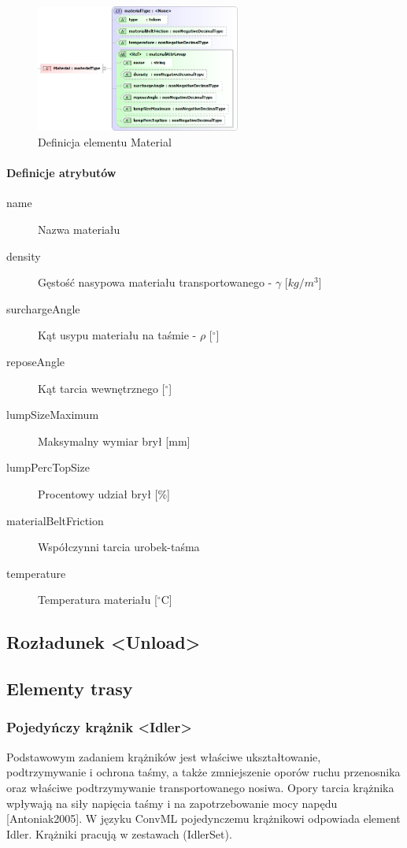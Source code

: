 \documentclass[12pt,a4paper]{article}
\begin{document}
\begin{figure}[h]
  \centering
  \includegraphics[width=0.6\textwidth]{png/liquid/Material}
  \caption{Definicja elementu Material}
  \label{fig:material-xsd}
\end{figure}

\paragraph{Definicje atrybutów}
\begin{description}
\item[name] Nazwa materiału
\item[density] Gęstość nasypowa materiału transportowanego - $\gamma$ [$kg/m^3$]
\item[surchargeAngle] Kąt usypu materiału na taśmie - $\rho$ [$^\circ$]
\item[reposeAngle] Kąt tarcia wewnętrznego [$^\circ$]
\item[lumpSizeMaximum] Maksymalny wymiar brył [mm]
\item[lumpPercTopSize] Procentowy udział brył [\%]
\item[materialBeltFriction] Współczynni tarcia urobek-taśma
\item[temperature] Temperatura materiału [$^\circ$C]
\end{description}


\subsection{Rozładunek <Unload>}


\subsection{Elementy trasy}


\subsubsection{Pojedyńczy krążnik <Idler>}
Podstawowym zadaniem krążników jest właściwe ukształtowanie, podtrzymywanie i ochrona taśmy,
a także zmniejszenie oporów ruchu przenosnika oraz właściwe podtrzymywanie transportowanego
nosiwa. Opory tarcia krążnika wpływają na siły napięcia taśmy i na zapotrzebowanie mocy napędu
[Antoniak2005]. W języku ConvML pojedynczemu krążnikowi odpowiada element Idler. Krążniki
pracują w zestawach (IdlerSet).
\end{document}
